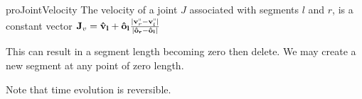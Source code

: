 \begin{restatable}{pro}{JointVelocity}
\label{pro:joint_velocity}
The velocity of a joint $J$ associated with segments $l$ and $r$, is a constant vector
$\vec J_v = \vec{\hat v_l} + \vec{\hat o_l}\frac{|\vec v_r^\shortparallel - \vec v_l^\shortparallel|}{|\vec{\hat o_r}-\vec{\hat o_l}|}$
\end{restatable}


This can result in a segment length becoming zero then delete.
We may create a new segment at any point of zero length.

Note that time evolution is reversible.
